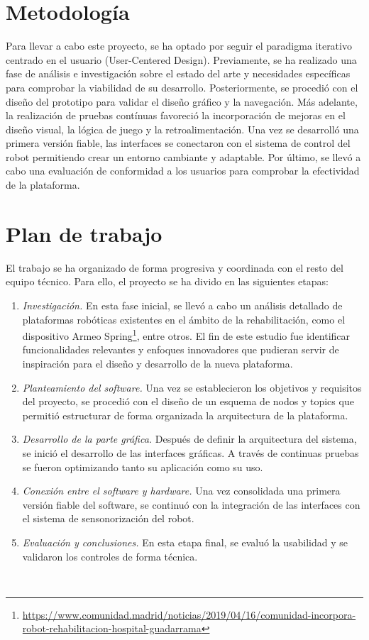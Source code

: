 \section{Metodología}
\label{sec:metodologia}

Para llevar a cabo este proyecto, se ha optado por seguir el paradigma iterativo centrado en el usuario (User-Centered Design).
Previamente, se ha realizado una fase de análisis e investigación sobre el estado del arte y necesidades específicas para comprobar la viabilidad de su desarrollo.
Posteriormente, se procedió con el diseño del prototipo para validar el diseño gráfico y la navegación.
Más adelante, la realización de pruebas contínuas favoreció la incorporación de mejoras en el diseño visual, la lógica de juego y la retroalimentación.
Una vez se desarrolló una primera versión fiable, las interfaces se conectaron con el sistema de control del robot permitiendo crear un entorno cambiante y adaptable.
Por último, se llevó a cabo una evaluación de conformidad a los usuarios para comprobar la efectividad de la plataforma.

\section{Plan de trabajo}
\label{sec:plantrabajo}

El trabajo se ha organizado de forma progresiva y coordinada con el resto del equipo técnico.
Para ello, el proyecto se ha divido en las siguientes etapas:

\begin{enumerate}
    \item \textit{Investigación.} En esta fase inicial, se llevó a cabo un análisis detallado de plataformas robóticas existentes en el ámbito de la rehabilitación, como el dispositivo Armeo Spring\footnote{\url{https://www.comunidad.madrid/noticias/2019/04/16/comunidad-incorpora-robot-rehabilitacion-hospital-guadarrama}}, entre otros. El fin de este estudio fue identificar funcionalidades relevantes y enfoques innovadores que pudieran servir de inspiración para el diseño y desarrollo de la nueva plataforma.
    \item \textit{Planteamiento del software.} Una vez se establecieron los objetivos y requisitos del proyecto, se procedió con el diseño de un esquema de nodos y topics que permitió estructurar de forma organizada la arquitectura de la plataforma.
    \item \textit{Desarrollo de la parte gráfica.} Después de definir la arquitectura del sistema, se inició el desarrollo de las interfaces gráficas. A través de continuas pruebas se fueron optimizando tanto su aplicación como su uso.
    \item \textit{Conexión entre el software y hardware.} Una vez consolidada una primera versión fiable del software, se continuó con la integración de las interfaces con el sistema de sensonorización del robot.
    \item \textit{Evaluación y conclusiones.} En esta etapa final, se evaluó la usabilidad y se validaron los controles de forma técnica.
\end{enumerate}\

